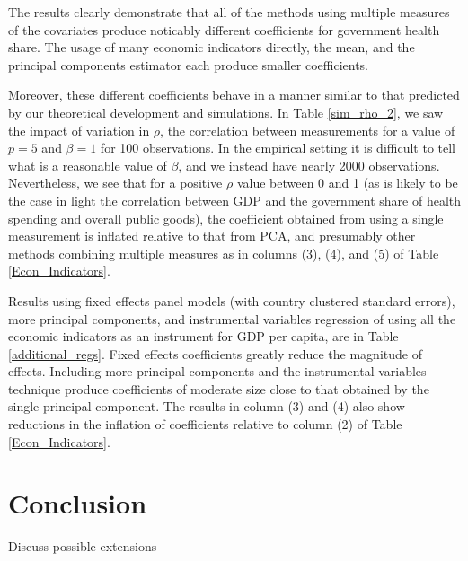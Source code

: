\documentclass[12pt]{article}
\begin{document}
        

        The results clearly demonstrate that all of the methods using multiple measures of the covariates produce noticably different coefficients for government health share. The usage of many economic indicators directly, the mean, and the principal components estimator each produce smaller coefficients.

        Moreover, these different coefficients behave in a manner similar to that predicted by our theoretical development and simulations. In Table \ref{sim_rho_2}, we saw the impact of variation in $\rho$, the correlation between measurements for a value of $p = 5$ and $\beta = 1$ for 100 observations. In the empirical setting it is difficult to tell what is a reasonable value of $\beta$, and we instead have nearly 2000 observations. Nevertheless, we see that for a positive $\rho$ value between 0 and 1 (as is likely to be the case in light the correlation between GDP and the government share of health spending and overall public goods), the coefficient obtained from using a single measurement is inflated relative to that from PCA, and presumably other methods combining multiple measures as in columns (3), (4), and (5) of Table \ref{Econ_Indicators}.

        Results using fixed effects panel models (with country clustered standard errors), more principal components, and instrumental variables regression of using all the economic indicators as an instrument for GDP per capita, are in Table \ref{additional_regs}. Fixed effects coefficients greatly reduce the magnitude of effects. Including more principal components and the instrumental variables technique produce coefficients of moderate size close to that obtained by the single principal component. The results in column (3) and (4) also show reductions in the inflation of coefficients relative to column (2) of Table \ref{Econ_Indicators}.

        

    \section*{Conclusion}
        
        Discuss possible extensions

    \clearpage
    \newpage

    
    
\end{document}
